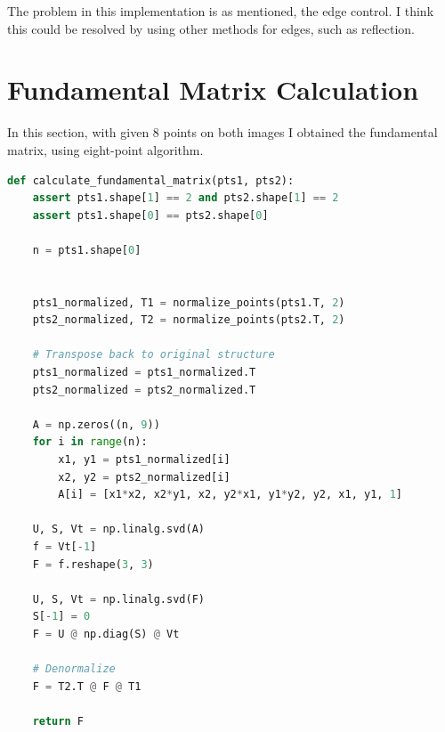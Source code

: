 The problem in this implementation is as mentioned, the edge control. I think this could be resolved by using other methods for edges, such as reflection.


\section*{Fundamental Matrix Calculation}
In this section, with given 8 points on both images I obtained the fundamental matrix, using eight-point algorithm.

\begin{lstlisting}[language=python]
def calculate_fundamental_matrix(pts1, pts2):
    assert pts1.shape[1] == 2 and pts2.shape[1] == 2
    assert pts1.shape[0] == pts2.shape[0]
    
    n = pts1.shape[0]
    
    
    pts1_normalized, T1 = normalize_points(pts1.T, 2)
    pts2_normalized, T2 = normalize_points(pts2.T, 2)
    
    # Transpose back to original structure
    pts1_normalized = pts1_normalized.T
    pts2_normalized = pts2_normalized.T
    
    A = np.zeros((n, 9))
    for i in range(n):
        x1, y1 = pts1_normalized[i]
        x2, y2 = pts2_normalized[i]
        A[i] = [x1*x2, x2*y1, x2, y2*x1, y1*y2, y2, x1, y1, 1]
    
    U, S, Vt = np.linalg.svd(A)
    f = Vt[-1]
    F = f.reshape(3, 3)
    
    U, S, Vt = np.linalg.svd(F)
    S[-1] = 0
    F = U @ np.diag(S) @ Vt
    
    # Denormalize
    F = T2.T @ F @ T1
    
    return F
\end{lstlisting}

